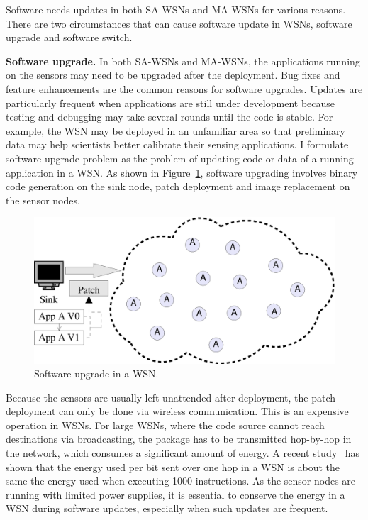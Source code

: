 Software needs updates in both SA-WSNs and MA-WSNs for various reasons.
There are two circumstances that can cause software update in WSNs, 
software upgrade and software switch.

\textbf{Software upgrade.}
In both SA-WSNs and MA-WSNs, the applications running on the sensors may need to be upgraded after the deployment.
Bug fixes and feature enhancements are the common reasons for software upgrades.
Updates are particularly frequent when applications are still under development because testing and debugging may take 
several rounds until the code is stable.
For example, the WSN may be deployed in an unfamiliar area so that preliminary data may help scientists better 
calibrate their sensing applications. I formulate software upgrade problem as the problem of updating code or data of a 
running application in a WSN. As shown in Figure~\ref{fig:upgrade}, software upgrading involves binary code generation 
on the sink node, patch deployment and image replacement on the sensor nodes.
\begin{figure}[htbp]
	\centering
		\includegraphics[scale=0.45]{figures/upgrade.eps}
	\caption{Software upgrade in a WSN.}
	\label{fig:upgrade}
\end{figure}
Because the sensors are usually left unattended after deployment, the patch deployment can only be done via wireless 
communication.
 This is an expensive operation in WSNs. For large WSNs, where the code source cannot reach destinations via 
broadcasting, the package has to be transmitted hop-by-hop in the network, which consumes a significant amount of 
energy. A recent study~\cite{related:barr-energy} has shown that the energy used per bit sent over one hop in a WSN is 
about the same the energy used when executing 1000 instructions. As the sensor nodes are running with limited power 
supplies, it is essential to conserve the energy in a WSN during software updates, especially when such updates are 
frequent.
 

